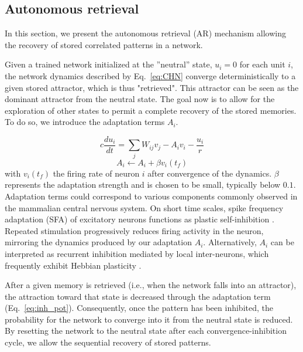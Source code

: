 \documentclass[10pt,letterpaper]{article}
\begin{document}
\subsection{Autonomous retrieval}
\label{sec:autonomous_rehearsal}
In this section, we present the autonomous retrieval (AR) mechanism allowing the recovery of stored correlated patterns in a network.

Given a trained network initialized at the ''neutral'' state, $u_i=0$ for each unit $i$, the network dynamics described by Eq.~\ref{eq:CHN} converge deterministically to a given stored attractor, which is thus "retrieved". This attractor can be seen as the dominant attractor from the neutral state. The goal now is to allow for the exploration of other states to permit a complete recovery of the stored memories.
To do so, we introduce the adaptation terms $A_{i}$.

\begin{equation}
\label{eq:CHN_with_shallowing}
c\frac{du_i}{dt} = \sum_j W_{ij}v_j - A_iv_i - \frac{u_i}{r}
\end{equation}
\begin{equation}
    \label{eq:inh_pot}
    A_i \leftarrow A_i+\beta v_i(t_{f})
\end{equation}
with $v_i(t_f)$ the firing rate of neuron $i$ after convergence of the dynamics. $\beta$ represents the adaptation strength and is chosen to be small, typically below $0.1$.
Adaptation terms could correspond to various components commonly observed in the mammalian central nervous system. On short time scales, spike frequency adaptation (SFA) of excitatory neurons functions as plastic self-inhibition \cite{ha_spike_2017,peron_spike_2009}. Repeated stimulation progressively reduces firing activity in the neuron, mirroring the dynamics produced by our adaptation $A_{i}$. Alternatively, $A_{i}$ can be interpreted as recurrent inhibition mediated by local inter-neurons, which frequently exhibit Hebbian plasticity \cite{kodangattil_spike_2013,damour_inhibitory_2015}.

After a given memory is retrieved (i.e., when the network falls into an attractor), 
the attraction toward that state is decreased through the adaptation term (Eq.~\ref{eq:inh_pot}). Consequently, once the pattern has been inhibited, the probability for the network to converge into it from the neutral state is reduced. By resetting the network to the neutral state after each convergence-inhibition cycle, we allow the sequential recovery of stored patterns.
\end{document}
